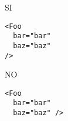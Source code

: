 \documentclass[../ProcessiPrimari.tex]{subfiles}
\begin{document}
\begin{center}{
		\begin{minipage}{6cm}
			{\begin{center}SI\end{center}}
			\begin{Verbatim}[frame=single]
<Foo
  bar="bar"
  baz="baz"
/>
			\end{Verbatim}
		\end{minipage}
		\hfil
		\begin{minipage}{5cm}
			{\begin{center}NO\end{center}}
			\begin{Verbatim}[frame=single]
<Foo
  bar="bar"
  baz="baz" />
			\end{Verbatim}
		\end{minipage}
	}
\end{center}
\end{document}
